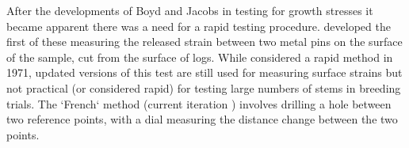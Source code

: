 After the developments of Boyd and Jacobs in testing for growth stresses it
became apparent there was a need for a rapid testing procedure. \citet{Nicholson_1971}
developed the first of these measuring the released strain between two metal pins
on the surface of the sample, cut from the surface of logs. While considered a
rapid method in 1971, updated versions of this test are still used for measuring
surface strains but not practical (or considered rapid) for testing large
numbers of stems in breeding trials. The `French` method (current
iteration \citep{Baill_res_1995}) involves drilling a hole between two reference
points, with a dial measuring the distance change between the two points.